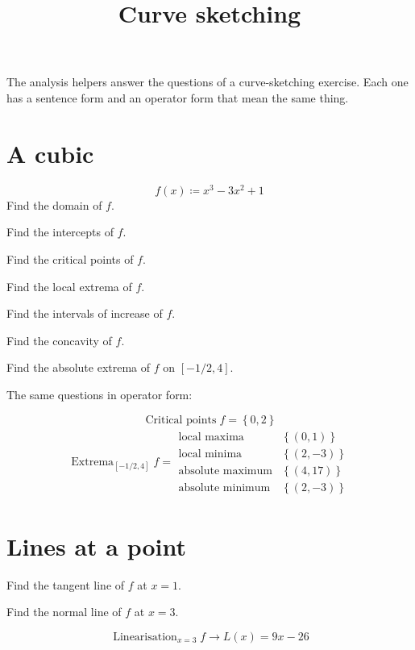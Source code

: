 \documentclass[11pt,a4paper]{article}
\title{Curve sketching}
\date{}
\theoremstyle{plain}
\theoremstyle{definition}
\theoremstyle{remark}
\begin{document}
\maketitle
The analysis helpers answer the questions of a curve-sketching exercise. Each one has a
sentence form and an operator form that mean the same thing.

\section*{A cubic}

\begin{equation*}
  f(x) \coloneqq  x^3 - 3x^2 + 1
\end{equation*}
Find the domain of $f$.

Find the intercepts of $f$.

Find the critical points of $f$.

Find the local extrema of $f$.

Find the intervals of increase of $f$.

Find the concavity of $f$.

Find the absolute extrema of $f$ on $[-1/2, 4]$.

The same questions in operator form:

\begin{equation*}
  \operatorname{Critical\ points} f = \left\{0, 2\right\}
\end{equation*}
\begin{align*}
  \operatorname{Extrema}_{[-1/2, 4]} f = \begin{array}{ll} \text{local maxima} & \left\{\left(0, 1\right)\right\} \\ \text{local minima} & \left\{\left(2, -3\right)\right\} \\ \text{absolute maximum} & \left\{\left(4, 17\right)\right\} \\ \text{absolute minimum} & \left\{\left(2, -3\right)\right\} \end{array}
\end{align*}
\section*{Lines at a point}

Find the tangent line of $f$ at $x = 1$.

Find the normal line of $f$ at $x = 3$.

\begin{equation*}
  \operatorname{Linearisation}_{x=3} f \to L\left(x\right) = 9 x - 26
\end{equation*}
\end{document}
